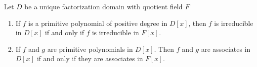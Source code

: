 \begin{corollary}
    Let $D$ be a unique factorization domain with quotient field $F$

    \begin{enumerate}
        \item
              If $f$ is a primitive polynomial of positive degree in $D[x]$,
              then $f$ is irreducible in $ D[ {x}]$ if and only if $f$ is irreducible in $ {F}[x]$.

        \item
              If $f$ and $g$ are primitive polynomials in $D[x]$. Then $f$ and $g$ are associates in $D[x]$ if and only if they are associates in $F[x]$.
    \end{enumerate}
\end{corollary}

